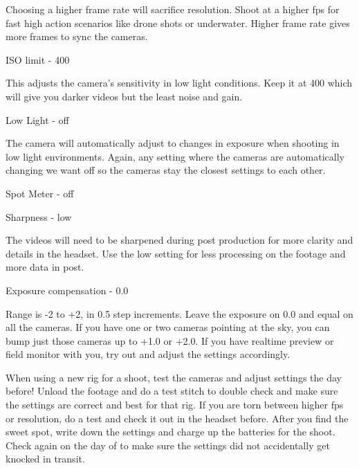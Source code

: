 \begin{fullwidth}
Choosing a higher frame rate will sacrifice resolution. Shoot at a higher fps for fast high action scenarios like drone shots or underwater. Higher frame rate gives more frames to sync the cameras.

{\large ISO limit - 400 \par}


This adjusts the camera’s sensitivity in low light conditions. Keep it at 400 which will give you darker videos but the least noise and gain. 

\clearpage
{\large Low Light - off \par}


The camera will automatically adjust to changes in exposure when shooting in low light environments. Again, any setting where the cameras are automatically changing we want off so the cameras stay the closest settings to each other. 

{\large Spot Meter - off \par}


\clearpage
{\large Sharpness - low \par}


The videos will need to be sharpened during post production for more clarity and details in the headset. Use the low setting for less processing on the footage and more data in post. 

{\large Exposure compensation - 0.0 \par} 


Range is -2 to +2, in 0.5 step increments. Leave the exposure on 0.0 and equal on all the cameras. If you have one or two cameras pointing at the sky, you can bump just those cameras up to +1.0 or +2.0. If you have realtime preview or field monitor with you, try out and adjust the settings accordingly. 

When using a new rig for a shoot, test the cameras and adjust settings the day before! Unload the footage and do a test stitch to double check and make sure the settings are correct and best for that rig. If you are torn between higher fps or resolution, do a test and check it out in the headset before. After you find the sweet spot, write down the settings and charge up the batteries for the shoot. Check again on the day of to make sure the settings did not accidentally get knocked in transit. 

\clearpage
\end{fullwidth}
